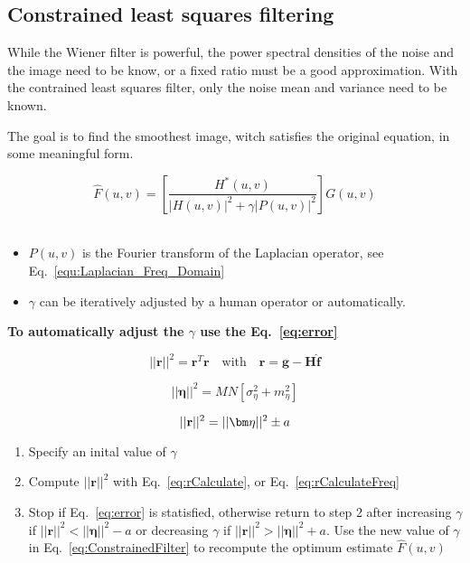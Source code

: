 \subsection{Constrained least squares filtering }
While the Wiener filter is powerful, the power spectral densities of the noise and the image need to be know, or a fixed ratio must be a good approximation. With the contrained least squares filter, only the noise mean and variance need to be known.

The goal is to find the smoothest image, witch satisfies the original equation, in some meaningful form.
 
\begin{equation}
	\hat{F}(u,v) = \left[ \frac{H^*(u,v)}{|H(u,v)|^2 + \gamma |P(u,v)|^2} \right] G(u,v)
	\label{eq:ConstrainedFilter}
\end{equation}\\

\begin{itemize}
	\item $P(u,v)$ is the Fourier transform of the Laplacian operator, see  Eq.~\ref{equ:Laplacian_Freq_Domain}
	\item $\gamma$ can be iteratively adjusted by a human operator or automatically.
\end{itemize}

\textbf{To automatically adjust the $\gamma$ use the Eq.~\ref{eq:error}}

\begin{equation}
	||\mathbf{r}||^{2} = \mathbf{r}^{T}\mathbf{r} \quad \textrm{with} \quad\mathbf{r} = \mathbf{g}-\mathbf{H} \mathbf{\hat{f}}	
	\label{eq:rCalculate}
\end{equation}

\begin{equation}
	||\bm\eta||^2= MN[\sigma_{\eta}^2 + m_{\eta}^2]	
\end{equation}

\begin{equation}
	||\mathbf{r}||^2 = ||\bm\eta||^2 \pm a
	\label{eq:error}\\
\end{equation}
\begin{enumerate}
	\item Specify an inital value of $\gamma$
	\item Compute $||\mathbf{r}||^2$ with Eq.~\ref{eq:rCalculate}, or  Eq.~\ref{eq:rCalculateFreq}
	\item Stop if Eq.~\ref{eq:error} is statisfied, otherwise return to step 2 after increasing $\gamma$ if $||\mathbf{r}||^2 < ||\bm\eta||^2-a$ or  decreasing $\gamma$ if  $||\mathbf{r}||^2 > ||\bm\eta||^2+a$. Use the new value of $\gamma$ in Eq.~\ref{eq:ConstrainedFilter} to recompute the optimum estimate $\hat{F}(u,v)$
\end{enumerate}

